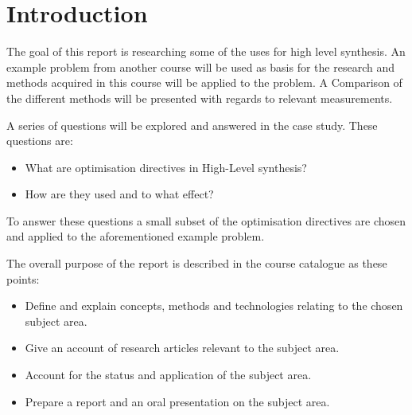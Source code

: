 \chapter{Introduction}
The goal of this report is researching some of the uses for high level synthesis. An example problem from another course will be used as basis for the research and methods acquired in this course will be applied to the problem. A Comparison of the different methods will be presented with regards to relevant measurements.

A series of questions will be explored and answered in the case study. These questions are:
\begin{itemize}
\item What are optimisation directives in High-Level synthesis?
\item How are they used and to what effect?
\end{itemize}
To answer these questions a small subset of the optimisation directives are chosen and applied to the aforementioned example problem. 

The overall purpose of the report is described in the course catalogue as these points:
\begin{itemize}
\item Define and explain concepts, methods and technologies relating to the chosen subject area.
\item Give an account of research articles relevant to the subject area.
\item Account for the status and application of the subject area.
\item Prepare a report and an oral presentation on the subject area.
\end{itemize}
  